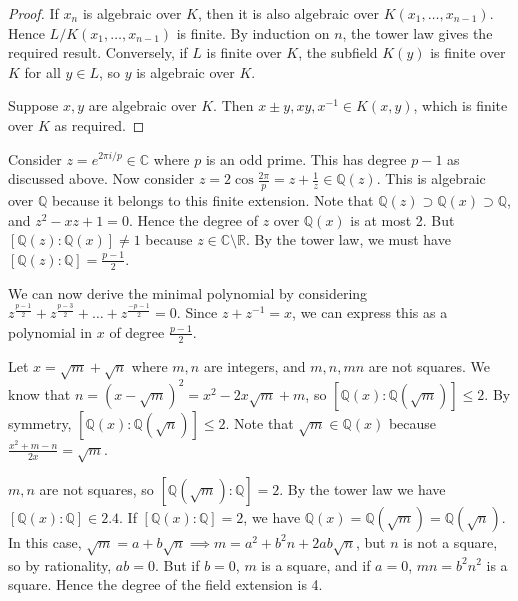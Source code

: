 \begin{proof}
	If \( x_n \) is algebraic over \( K \), then it is also algebraic over \( K(x_1, \dots, x_{n-1}) \).
	Hence \( L / K(x_1, \dots, x_{n-1}) \) is finite.
	By induction on \( n \), the tower law gives the required result.
	Conversely, if \( L \) is finite over \( K \), the subfield \( K(y) \) is finite over \( K \) for all \( y \in L \), so \( y \) is algebraic over \( K \).

	Suppose \( x, y \) are algebraic over \( K \).
	Then \( x \pm y, xy, x^{-1} \in K(x,y) \), which is finite over \( K \) as required.
\end{proof}
\begin{example}
	Consider \( z = e^{2\pi i/p} \in \mathbb C \) where \( p \) is an odd prime.
	This has degree \( p - 1 \) as discussed above.
	Now consider \( z = 2\cos \frac{2\pi}{p} = z + \frac 1z \in \mathbb Q(z) \).
	This is algebraic over \( \mathbb Q \) because it belongs to this finite extension.
	Note that \( \mathbb Q(z) \supset \mathbb Q(x) \supset \mathbb Q \), and \( z^2 - xz + 1 = 0 \).
	Hence the degree of \( z \) over \( \mathbb Q(x) \) is at most 2.
	But \( [\mathbb Q(z):\mathbb Q(x)] \neq 1 \) because \( z \in \mathbb C \setminus \mathbb R \).
	By the tower law, we must have \( [\mathbb Q(z):\mathbb Q] = \frac{p-1}{2} \).

	We can now derive the minimal polynomial by considering \( z^{\frac{p-1}{2}} + z^{\frac{p-3}{2}} + \dots + z^{\frac{-p-1}{2}} = 0 \).
	Since \( z + z^{-1} = x \), we can express this as a polynomial in \( x \) of degree \( \frac{p-1}{2} \).
\end{example}
\begin{example}
	Let \( x = \sqrt m + \sqrt n \) where \( m, n \) are integers, and \( m, n, mn \) are not squares.
	We know that \( n = (x-\sqrt m)^2 = x^2 - 2x\sqrt m + m \), so \( [\mathbb Q(x):\mathbb Q(\sqrt m)] \leq 2 \).
	By symmetry, \( [\mathbb Q(x):\mathbb Q(\sqrt n)] \leq 2 \).
	Note that \( \sqrt m \in \mathbb Q(x) \) because \( \frac{x^2 + m - n}{2x} = \sqrt m \).

	\( m, n \) are not squares, so \( [\mathbb Q(\sqrt m):\mathbb Q] = 2 \).
	By the tower law we have \( [\mathbb Q(x):\mathbb Q] \in \qty{2,4} \).
	If \( [\mathbb Q(x):\mathbb Q] = 2 \), we have \( \mathbb Q(x) = \mathbb Q(\sqrt m) = \mathbb Q(\sqrt n) \).
	In this case, \( \sqrt m = a + b \sqrt n \implies m = a^2 + b^2 n + 2ab \sqrt n \), but \( n \) is not a square, so by rationality, \( ab = 0 \).
	But if \( b = 0 \), \( m \) is a square, and if \( a = 0 \), \( mn = b^2 n^2 \) is a square.
	Hence the degree of the field extension is 4.
\end{example}
